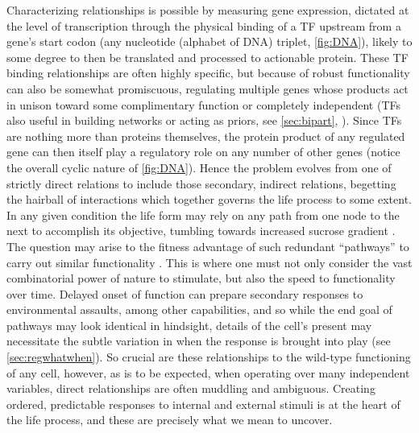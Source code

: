Characterizing relationships is possible by measuring gene expression, dictated at the level of transcription through the physical binding of a TF upstream from a gene's start codon (any nucleotide (alphabet of DNA) triplet, \cref{fig:DNA}), likely to some degree to then be translated and processed to actionable protein. These TF binding relationships are often highly specific, but because of robust functionality can also be somewhat promiscuous, regulating multiple genes whose products act in unison toward some complimentary function or completely independent (TFs also useful in building networks or acting as priors, see \cref{sec:bipart}, \citep{ogris2017funcoup}). Since TFs are nothing more than proteins themselves, the protein product of any regulated gene can then itself play a regulatory role on any number of other genes (notice the overall cyclic nature of \cref{fig:DNA}). Hence the problem evolves from one of strictly direct relations to include those secondary, \etc indirect relations, begetting the hairball of interactions which together governs the life process to some extent. In any given condition the life form may rely on any path from one node to the next to accomplish its objective, \eg tumbling towards increased sucrose gradient \citep{di2005chemogenomic}. The question may arise to the fitness advantage of such redundant ``pathways'' to carry out similar functionality \citep{layek2011biological}. This is where one must not only consider the vast combinatorial power of nature to stimulate, but also the speed to functionality over time. Delayed onset of function can prepare secondary responses to environmental assaults, among other capabilities, and so while the end goal of pathways may look identical in hindsight, details of the cell's present may necessitate the subtle variation in when the response is brought into play (see \cref{sec:regwhatwhen}). So crucial are these relationships to the wild-type functioning of any cell, however, as is to be expected, when operating over many independent variables, direct relationships are often muddling and ambiguous. Creating ordered, predictable responses to internal and external stimuli is at the heart of the life process, and these are precisely what we mean to uncover.

